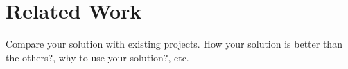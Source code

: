 

\chapter{Related Work} %
Compare your solution with existing projects. How your solution is better than the others?, why to use your solution?, etc.




\ifpdf
    \graphicspath{{8/figures/PNG/}{8/figures/PDF/}{8/figures/}}
\else
    \graphicspath{{8/figures/EPS/}{8/figures/}}
\fi




 




 






